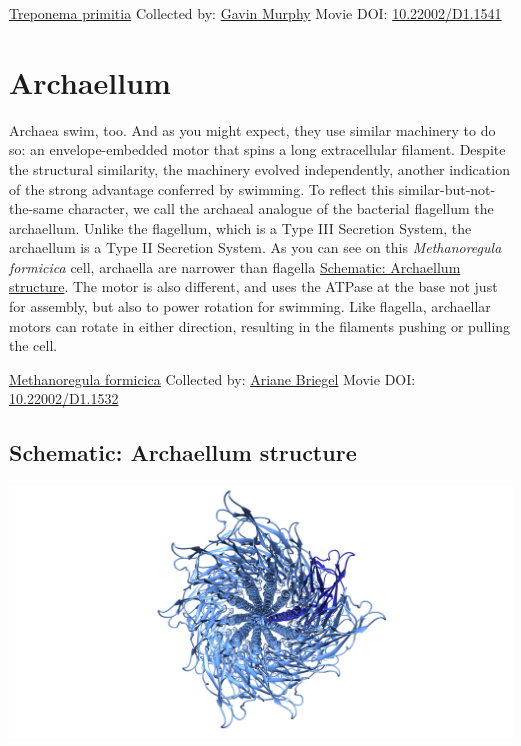 \documentclass[]{tufte-book}
\begin{document}
\hypertarget{htmlwidget-a175e6c45daf8e8fdb08}{}

\label{fig:6-7a}\protect\hyperlink{tree}{Treponema primitia} Collected by: \protect\hyperlink{gavin_murphy}{Gavin Murphy} Movie DOI: \href{https://doi.org/10.22002/D1.1541}{10.22002/D1.1541}

\hypertarget{archaellum}{%
\section{Archaellum}\label{archaellum}}

Archaea swim, too. And as you might expect, they use similar machinery to do so: an envelope-embedded motor that spins a long extracellular filament. Despite the structural similarity, the machinery evolved independently, another indication of the strong advantage conferred by swimming. To reflect this similar-but-not-the-same character, we call the archaeal analogue of the bacterial flagellum the archaellum. Unlike the flagellum, which is a Type III Secretion System, the archaellum is a Type II Secretion System. As you can see on this \emph{Methanoregula formicica} cell, archaella are narrower than flagella \protect\hyperlink{Archaellum_structure}{Schematic: Archaellum structure}. The motor is also different, and uses the ATPase at the base not just for assembly, but also to power rotation for swimming. Like flagella, archaellar motors can rotate in either direction, resulting in the filaments pushing or pulling the cell.



\hypertarget{htmlwidget-3e3846e83a222cebd969}{}

\label{fig:6-8}\protect\hyperlink{tree}{Methanoregula formicica} Collected by: \protect\hyperlink{ariane_briegel}{Ariane Briegel} Movie DOI: \href{https://doi.org/10.22002/D1.1532}{10.22002/D1.1532}

\hypertarget{Archaellum_structure}{%
\subsection*{Schematic: Archaellum structure}\label{Archaellum_structure}}

\includegraphics{img/schematics/6_8_1}
\end{document}
